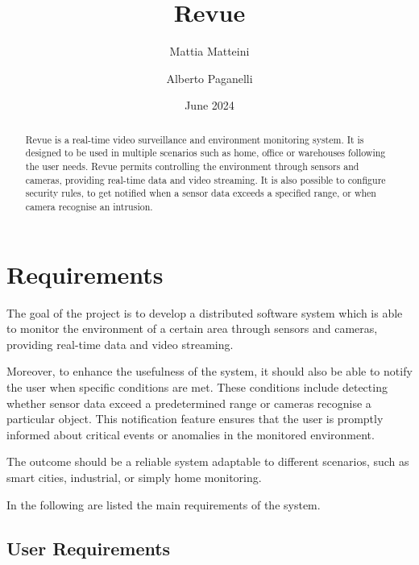 \documentclass{scrartcl}
\title{
    Revue
}
\author{
    Mattia Matteini \\ \emailaddr{mattia.matteini@studio.unibo.it}
    \and
    Alberto Paganelli \\ \emailaddr{alberto.paganelli3@studio.unibo.it}
}
\date{June 2024}
\begin{document}
    \maketitle

    \begin{abstract}
        Revue is a real-time video surveillance and environment monitoring system.
        It is designed to be used in multiple scenarios such as home, office or warehouses following the user needs.
%
        Revue permits controlling the environment through sensors and cameras, providing real-time data and video streaming.
        It is also possible to configure security rules, to get notified when a sensor data exceeds a specified range, or when camera recognise an intrusion.
    \end{abstract}


    \section{Requirements}

    The goal of the project is to develop a distributed software system which is able to monitor the environment
    of a certain area through sensors and cameras, providing real-time data and video streaming.

    Moreover, to enhance the usefulness of the system, it should also be able to notify the user when specific conditions are met.
    These conditions include detecting whether sensor data exceed a predetermined range or cameras recognise a particular object.
    This notification feature ensures that the user is promptly informed about critical
    events or anomalies in the monitored environment.

    The outcome should be a reliable system adaptable to different scenarios, such as smart cities, industrial, or
    simply home monitoring.

    In the following are listed the main requirements of the system.

    \subsection{User Requirements}\label{subsec:user-requirements}
\end{document}

